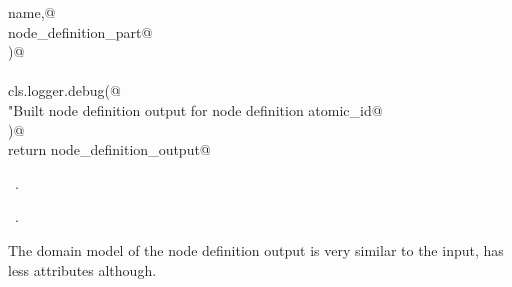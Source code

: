 \documentclass[
    a4paper,      %
    10pt,         %
    openright,    %
    notitlepage,  %
    parskip=half, %
]{scrreprt}       %
\theoremstyle{definition}                    %
\begin{document}
\begin{flushleft}
\begin{minipage}{\linewidth}
\begin{list}{}{}
\mbox{}\lstinline@        name,@\\
\mbox{}\lstinline@        node_definition_part@\\
\mbox{}\lstinline@    )@\\
\mbox{}\lstinline@@\\
\mbox{}\lstinline@    cls.logger.debug(@\\
\mbox{}\lstinline@        "Built node definition output for node definition %s",@\\
\mbox{}\lstinline@        atomic_id@\\
\mbox{}\lstinline@    )@\\
\mbox{}\lstinline@    return node_definition_output@\\
\mbox{}\lstinline@@{\NWsep}
\end{list}
\vspace{-1.5ex}
\footnotesize
\begin{list}{}{\setlength{\itemsep}{-\parsep}\setlength{\itemindent}{-\leftmargin}}
\item \NWtxtMacroDefBy\ .
\item \NWtxtMacroRefIn\ .

\item{}
\end{list}
\end{minipage}\vspace{4ex}
\end{flushleft}
The domain model of the node definition output is very similar to the input,
has less attributes although.
\end{document}
